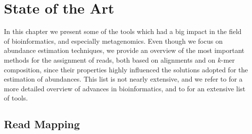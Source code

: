 
\chapter{State of the Art}
\label{Chapter2}

In this chapter we present some of the tools which had a big impact in the field of bioinformatics, and especially metagenomics. Even though we focus on abundance estimation techniques, we provide an overview of the most important methods for the assignment of reads, both based on alignments and on $k$-mer composition, since their properties highly influenced the solutions adopted for the estimation of abundances. This list is not nearly extensive, and we refer to \cite{kucherov_algorithms_2018} for a more detailed overview of advances in bioinformatics, and to \cite{brinda_novel_2016} for an extensive list of tools.

\section{Read Mapping}
